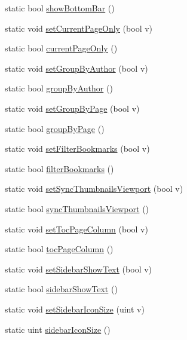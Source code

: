 \begin{DoxyCompactItemize}
static bool \hyperlink{classOkular_1_1Settings_a1ef3391c0883d93cad047c0812754d0e}{show\+Bottom\+Bar} ()
\item 
static void \hyperlink{classOkular_1_1Settings_a00e789d25056a701210b30185e30049f}{set\+Current\+Page\+Only} (bool v)
\item 
static bool \hyperlink{classOkular_1_1Settings_a67d787337dc0105e62740f96c5b1f051}{current\+Page\+Only} ()
\item 
static void \hyperlink{classOkular_1_1Settings_a7cd8fe5ea656b6b6e6b88d618c448fbb}{set\+Group\+By\+Author} (bool v)
\item 
static bool \hyperlink{classOkular_1_1Settings_a99abbb11bc16718150567ce0a74e8d62}{group\+By\+Author} ()
\item 
static void \hyperlink{classOkular_1_1Settings_a5de0d1e0ec6c097927879346de844886}{set\+Group\+By\+Page} (bool v)
\item 
static bool \hyperlink{classOkular_1_1Settings_a592fc48a4117954619e0969e8adbeb39}{group\+By\+Page} ()
\item 
static void \hyperlink{classOkular_1_1Settings_a469fef5f629f0f7973a17bc7550bc9ec}{set\+Filter\+Bookmarks} (bool v)
\item 
static bool \hyperlink{classOkular_1_1Settings_aeb1f5667ffc09f470b17f63f50af7dac}{filter\+Bookmarks} ()
\item 
static void \hyperlink{classOkular_1_1Settings_ad4d740b78292cc08b162e4de490b5a0c}{set\+Sync\+Thumbnails\+Viewport} (bool v)
\item 
static bool \hyperlink{classOkular_1_1Settings_a8add77e05e8fd78b01f68e62a0eb9f6f}{sync\+Thumbnails\+Viewport} ()
\item 
static void \hyperlink{classOkular_1_1Settings_a29ab2a10f32a81cb86aef62796d63520}{set\+Toc\+Page\+Column} (bool v)
\item 
static bool \hyperlink{classOkular_1_1Settings_a239ef0d5ac70f31760443a3f19b66536}{toc\+Page\+Column} ()
\item 
static void \hyperlink{classOkular_1_1Settings_ae5ab90dc4740f6e7bff7f1b0280188da}{set\+Sidebar\+Show\+Text} (bool v)
\item 
static bool \hyperlink{classOkular_1_1Settings_ac4f8b391baac3dc6729dbc9f194df312}{sidebar\+Show\+Text} ()
\item 
static void \hyperlink{classOkular_1_1Settings_a4ddb9916c1b0e37b21e69a8f7196231b}{set\+Sidebar\+Icon\+Size} (uint v)
\item 
static uint \hyperlink{classOkular_1_1Settings_a24a95037ed55b931356e6f0afb3baa4e}{sidebar\+Icon\+Size} ()

\end{DoxyCompactItemize}
